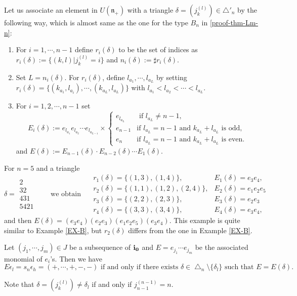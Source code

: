 Let us associate an element in $U({\mathfrak n}_+)$ 
with a triangle ${\delta}=({j_{k}^{(l)}})\in {\bigtriangleup}'_n$ by the following way,
which is almost same as the one for the 
type $B_n$ in \ref{proof-thm-Lm-n}:
\begin{enumerate}
\item
For $i=1,{\cdots},n-1$ define $r_i({\delta})$ to be the set of indices as
$r_i({\delta}):=\{(k,l)|{j_{k}^{(l)}}=i\}$ and 
$n_i({\delta}):=\sharp r_i({\delta})$.
\item
Set $L=n_i({\delta})$. 
For $r_i({\delta})$, define $l_{a_1},{\cdots},l_{a_L}$ by setting 
$r_i({\delta})=\{(k_{a_1},l_{a_i}),{\cdots},(k_{a_{L}},l_{a_L})\}$
with $l_{a_1}<l_{a_2}<{\cdots}<l_{a_L}$.
\item For $i=1,2,{\cdots}, n-1$ set 
\[
 E_i({\delta}):=e_{l_{a_1}}e_{l_{a_2}}{\cdots} e_{l_{a_{L-1}}}\times
\begin{cases}e_{l_{a_L}}&\text{ if $l_{a_L}\ne n-1$},\\
e_{n-1}&\text{if $l_{a_L}=n-1$ and $k_{a_L}+l_{a_L}$ is odd,}\\
e_{n}&\text{if $l_{a_L}=n-1$ and $k_{a_L}+l_{a_L}$ is even.}
\end{cases}
\]
and $E({\delta}):=E_{n-1}({\delta})\cdot E_{n-2}({\delta}){\cdots} E_1({\delta})$.
\end{enumerate}
\begin{ex}
For $n=5$ and a triangle 
\[
{\delta}=\begin{array}{c}
2\\32\\431\\5421
\end{array}{\qquad}
\text{we obtain }{\quad}
\begin{array}{ll}
r_1({\delta})=\{(1,3),(1,4)\},&E_1({\delta})=e_3e_4,\\
r_2({\delta})=\{(1,1),(1,2),(2,4)\},&E_2({\delta})=e_1e_2e_5\\
r_3({\delta})=\{(2,2),(2,3)\},&E_3({\delta})=e_2e_3\\
r_4({\delta})=\{(3,3),(3,4)\},&E_4({\delta})=e_3e_4,
\end{array}
\]
and then $E({\delta})=(e_3e_4)(e_2e_3)(e_1e_2e_5)(e_3e_4)$. 
This example is quite similar to Example \ref{EX-B}, but $r_2({\delta})$
 differs from the one in Example \ref{EX-B}.
\end{ex}

\begin{lem}\label{tri-ep-d}
Let $(j_1,{\cdots},j_m)\in J$ be a subsequence of $\bfii0$ 
and $E=e_{j_1}{\cdots} e_{j_m}$ be the associated
monomial of $e_i$'s. Then we have 
\begin{equation}
E{\epsilon}_l=s_n{\epsilon}_h=(+,{\cdots},+,-,-)\text{ if and only if there exists } 
{\delta}\in {\bigtriangleup}_n\setminus\{{\delta}_l\}\text{ such that }
E=E({\delta}).
\end{equation}
\end{lem}
Note that ${\delta}=({j_{k}^{(l)}})\ne{\delta}_l$ if and only if ${j_{n-1}^{(n-1)}}=n$.


